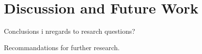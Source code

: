 
\chapter{Discussion and Future Work}

Conclusions i nregards to resarch questions? 

Recommandations for further research.

\cleardoublepage